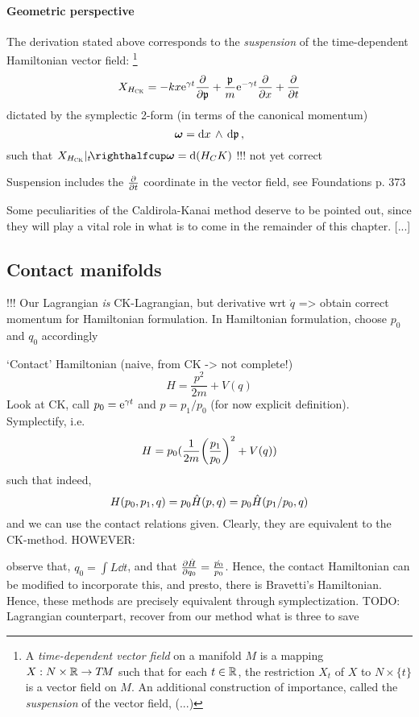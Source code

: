\paragraph{Geometric perspective}
The derivation stated above corresponds to the \emph{suspension} of the time-dependent Hamiltonian vector field: 
\footnote{A \emph{time-dependent vector field} on a manifold $M$ is a mapping $X: N\times\mathbb{R} \to T\!M$ such that for each $t \in \mathbb{R}$, the
restriction $X_t$ of $X$ to $N \times \{t\}$ is a vector field on $M$. \cite{Libermann1987} An additional construction
of importance, called the \emph{suspension} of the vector field, (...)}
    $$ X_{H_\text{\tiny{\textsc{CK}}}} = -kx\mathrm{e}^{\gamma t}\pdv{}{\mathfrak{p}} + \frac{\mathfrak{p}}{m}\mathrm{e}^{-\gamma t}\pdv{}{x} + \pdv{}{t}$$
dictated by the symplectic 2-form (in terms of the canonical momentum)
    $$ \vec{\omega} = \wedgep{\dd{x}}{\dd{\mathfrak{p}}}, $$
such that $\intpr{X_{\Hck}\vert_t}{\vec{\omega}} = \dd(H_CK)$ !!! not yet correct

Suspension includes the $\pdv{}{t}$ coordinate in the vector field, see Foundations p. 373

Some peculiarities of the Caldirola-Kanai method deserve to be pointed out, since they will play a vital role in what 
is to come in the remainder of this chapter. [...]

\subsection{Contact manifolds}

!!!
Our Lagrangian \emph{is} CK-Lagrangian, but
derivative wrt $\dot{q}$ => obtain correct momentum for Hamiltonian formulation.
In Hamiltonian formulation, choose $p_0$ and $q_0$ accordingly

`Contact' Hamiltonian (naive, from CK -> not complete!)
$$ \hat{H} = \frac{p^2}{2m} + V(q) $$
Look at CK, call $p_0 = \mathrm{e}^{\gamma t}$ and $p = p_1/p_0$ (for now explicit definition). Symplectify, i.e. 
$$ H = p_0 (\frac{1}{2m}\qty(\frac{p_1}{p_0})^2 + V(q)) $$
such that indeed, 
$$ H(p_0, p_1, q)= p_0 \hat{H}(p, q) = p_0 \hat{H}\qty(p_1/p_0, q) $$
and we can use the contact relations given. Clearly, they are equivalent to the CK-method.
HOWEVER:

observe that, $q_0 = \int L \dd{t}$, and that $\pdv{\hat{H}}{q_0} = \frac{\dot{p_0}}{p_0}$.
Hence, the contact Hamiltonian can be modified to incorporate this, and presto, there is Bravetti's Hamiltonian. Hence,
these methods are precisely equivalent through symplectization.
TODO: Lagrangian counterpart, recover from our method what is three to save




